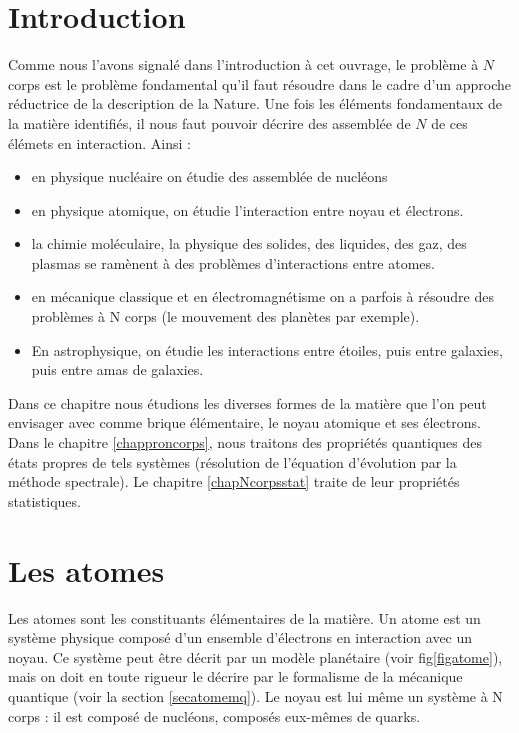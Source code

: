 \documentclass[12pt]{book}
\begin{document}
\section{Introduction}
Comme nous l'avons signal\'e dans l'introduction \`a cet ouvrage, le
probl\`eme \`a $N$ corps est le probl\`eme fondamental qu'il faut
r\'esoudre dans le cadre d'un approche r\'eductrice de la description
de la Nature. Une fois les \'el\'ements fondamentaux de la mati\`ere
identifi\'es, il nous faut pouvoir d\'ecrire des assembl\'ee de $N$ de
ces \'el\'emets en interaction. Ainsi :
\begin{itemize}
\item en physique nucl\'eaire on \'etudie des assembl\'ee de nucl\'eons
\item en physique atomique, on \'etudie l'interaction entre noyau et
\'electrons.
\item la chimie mol\'eculaire, la physique des solides, des liquides,
des gaz, des plasmas se ram\`enent \`a des probl\`emes d'interactions
entre  atomes.
\item en m\'ecanique classique et en \'electromagn\'etisme on a parfois \`a
r\'esoudre des probl\`emes \`a N corps (le mouvement des plan\`etes par
exemple). 
\item En astrophysique, on \'etudie les interactions entre \'etoiles, puis
entre galaxies, puis entre amas de galaxies.
\end{itemize}
Dans ce chapitre nous \'etudions les diverses formes de la mati\`ere
que l'on peut envisager avec comme brique \'el\'ementaire, le noyau
atomique et ses \'electrons.
Dans le chapitre \ref{chapproncorps}, nous traitons des propri\'et\'es
quantiques des \'etats propres de tels syst\`emes (r\'esolution de
l'\'equation 
d'\'evolution par la m\'ethode spectrale). Le chapitre
\ref{chapNcorpsstat} traite de leur propri\'et\'es statistiques.

\section{Les atomes}
Les atomes\cite{ph:atomi:Cagnac71,ph:mecaq:Cohen73} sont les
constituants \'el\'ementaires de la mati\`ere. 
Un atome est un syst\`eme physique compos\'e d'un ensemble d'\'electrons en
interaction avec un noyau. Ce syst\`eme peut \^etre d\'ecrit par
un mod\`ele plan\'etaire (voir fig\ref{figatome}), mais on doit en
toute rigueur le d\'ecrire par le formalisme de la m\'ecanique
quantique (voir la section \ref{secatomemq}). Le noyau est lui m\^eme un
syst\`eme \`a N corps : il est 
compos\'e de nucl\'eons, compos\'es eux-m\^emes de quarks.
\end{document}

